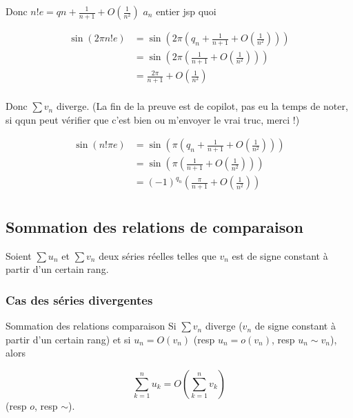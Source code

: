 \begin{exemple}
    Donc $n ! e = qn + \frac 1 {n + 1} + O(\frac 1 {n^2})$ $a_n$ entier jsp quoi 

    \begin{align*}
        \sin(2 \pi n! e) & = \sin \left( 2 \pi \left( q_n + \frac 1 {n + 1} + O\left( \frac 1 {n^2} \right) \right) \right) \\
                                    & = \sin \left( 2 \pi \left( \frac 1 {n + 1} + O\left( \frac 1 {n^2} \right) \right) \right) \\
                                    & = \frac {2 \pi}{n + 1} + O\left( \frac 1 {n^2} \right) \\
    \end{align*}

    Donc $\sum v_n$ diverge. (La fin de la preuve est de copilot, pas eu la temps de noter, si qqun peut 
    vérifier que c'est bien ou m'envoyer le vrai truc, merci !) 
    
    \begin{align*}
        \sin(n! \pi e) & = \sin \left( \pi \left( q_n + \frac 1 {n + 1} + O\left( \frac 1 {n^2} \right) \right) \right) \\
                                    & = \sin \left( \pi \left( \frac 1 {n + 1} + O\left( \frac 1 {n^2} \right) \right) \right) \\
                                    & = (-1)^{q_n} \left( \frac{\pi}{n + 1} + O\left( \frac 1 {n^2} \right) \right) \\
    \end{align*}


\end{exemple}

\subsection{Sommation des relations de comparaison }

Soient $\sum u_n$ et $\sum v_n$ deux séries réelles telles que $v_n$ est de signe constant à partir 
d'un certain rang. 

\subsubsection{Cas des séries divergentes }

\begin{proposition}{Sommation des relations comparaison}{}
    Si $\sum v_n$ diverge ($v_n$ de signe constant à partir d'un certain rang) et si $u_n = O(v_n)$ (resp $u_n = o(v_n)$, resp $u_n \sim v_n$),
    alors 
    
    $$\displaystyle \sum_{k = 1 }^{n }u_k = O\left( \sum_{k = 1}^{n} v_k \right)$$ 
    (resp $o$, resp $\sim$).
\end{proposition}

